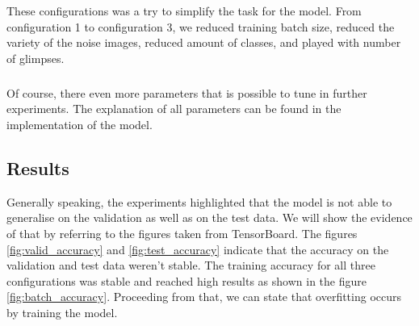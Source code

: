\begin{table}[]
\centering
{}
\caption{Configurations for the experiments}
\label{tab:conf_exp}
\end{table}

These configurations was a try to simplify the task for the model. From configuration 1
to configuration 3, we reduced training batch size, reduced the variety of the noise images,
reduced amount of classes, and played with number of glimpses.

\subparagraph{}
Of course, there even more parameters that is possible to tune
in further experiments. The explanation of all parameters can be found
in the implementation of the model.

\subsection{Results}
Generally speaking, the experiments highlighted that the model is not able
to generalise on the validation as well as on the test data.
We will show the evidence of that by referring to the figures taken from
TensorBoard.
The figures \ref{fig:valid_accuracy} and \ref{fig:test_accuracy} indicate that the accuracy on the validation
and test data weren't stable. The training accuracy for all three configurations
was stable and reached high results as shown in the figure \ref{fig:batch_accuracy}.
Proceeding from that, we can state that overfitting occurs
by training the model.

